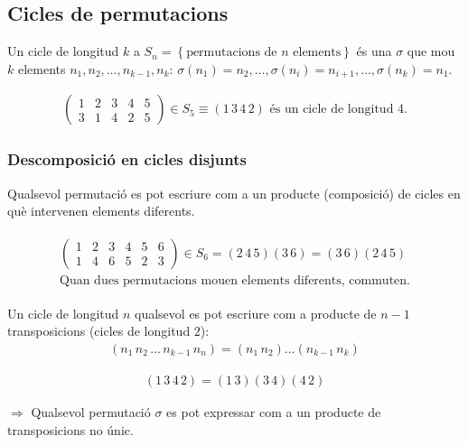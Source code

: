 \subsection{Cicles de permutacions}
Un cicle de longitud $k$ a $S_{n} = \left\{ \text{permutacions de $n$ elements} \right\}$ és una $\sigma$ que mou $k$ elements $n_{1} , n_{2} , \dots , n_{k-1} , n_{k}$: $\sigma (n_{1}) = n_{2} , \dots , \sigma (n_{i}) = n_{i+1} , \dots , \sigma (n_{k}) = n_{1}$.
\begin{example}
\begin{align*}
    \begin{pmatrix} 1 & 2 & 3 & 4 & 5 \\ 3 & 1 & 4 & 2 &5 \end{pmatrix} \in S_{5} \equiv (1 \, 3 \, 4 \, 2) \text{ és un cicle de longitud $4$}.
\end{align*}
\end{example}

\subsubsection*{Descomposició en cicles disjunts}
Qualsevol permutació es pot escriure com a un producte (composició) de cicles en què intervenen elements diferents.
\begin{example}
\begin{align*}
\begin{gathered}
    \begin{pmatrix} 1 & 2 & 3 & 4 & 5 & 6 \\ 1 & 4 & 6 & 5 & 2 & 3 \end{pmatrix} \in S_{6} = (2 \, 4 \, 5) (3 \, 6) = (3 \, 6)  (2 \, 4 \, 5)\\
    \text{Quan dues permutacions mouen elements diferents, commuten.}
\end{gathered}
\end{align*}
\end{example}
Un cicle de longitud $n$ qualsevol es pot escriure com a producte de $n-1$ transposicions (cicles de longitud $2$):
\begin{align}
    (n_{1} \, n_{2} \, \dots \, n_{k-1} \, n_{n}) = (n_{1} \, n_{2}) \dots (n_{k-1} \, n_{k})
\end{align}

\begin{example}
\begin{align*}
    (1 \, 3 \, 4 \, 2) = (1 \, 3) (3 \, 4) (4 \, 2)
\end{align*}
\end{example}
$\Rightarrow$ Qualsevol permutació $\sigma$ es pot expressar com a un producte de transposicions no únic.

